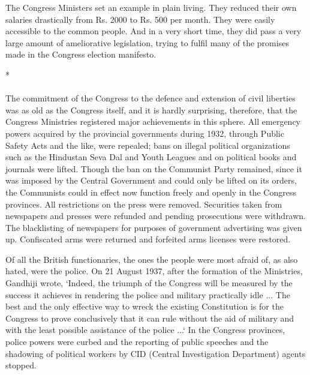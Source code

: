 The Congress Ministers set an example in plain living. They reduced their own salaries drastically from Rs. 2000 to Rs. 500 per month. They were easily accessible to the common people. And in a very short time, they did pass a very large amount of ameliorative legislation, trying to fulfil many of the promises made in the Congress election manifesto.

\begin{center}*\end{center}

\paragraph*{}

The commitment of the Congress to the defence and extension of civil liberties was as old as the Congress itself, and it is hardly surprising, therefore, that the Congress Ministries registered major achievements in this sphere. All emergency powers acquired by the provincial governments during 1932, through Public Safety Acts and the like, were repealed; bans on illegal political organizations such as the Hindustan Seva Dal and Youth Leagues and on political books and journals were lifted. Though the ban on the Communist Party remained, since it was imposed by the Central Government and could only be lifted on its orders, the Communists could in effect now function freely and openly in the Congress provinces. All restrictions on the press were removed. Securities taken from newspapers and presses were refunded and pending prosecutions were withdrawn. The blacklisting of newspapers for purposes of government advertising was given up. Confiscated arms were returned and forfeited arms licenses were restored. 

Of all the British functionaries, the ones the people were most afraid of, as also hated, were the police. On 21 August 1937, after the formation of the Ministries, Gandhiji wrote, `Indeed, the triumph of the Congress will be measured by the success it achieves in rendering the police and military practically idle ... The best and the only effective way to wreck the existing Constitution is for the Congress to prove conclusively that it can rule without the aid of military and with the least possible assistance of the police ...` In the Congress provinces, police powers were curbed and the reporting of public speeches and the shadowing of political workers by CID (Central Investigation Department) agents stopped. 

